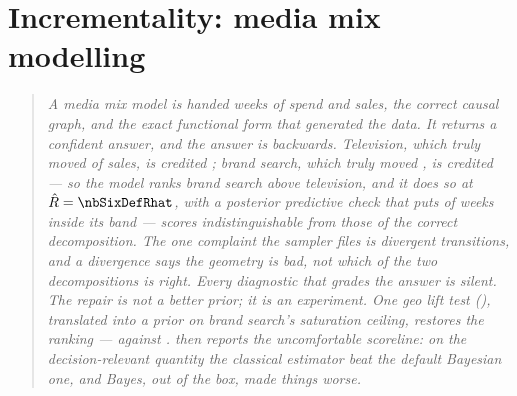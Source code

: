 %
\chapter{Incrementality: media mix modelling}
\label{ch:mmm}

\begin{quote}\small
\emph{A media mix model is handed \nbSixNWeeks{} weeks of spend and sales, the correct causal
graph, and the exact functional form that generated the data. It returns a confident answer, and
the answer is backwards. Television, which truly moved \eur{\nbSixTrueTv} of sales, is credited
\eur{\nbSixDefTv}; brand search, which truly moved \eur{\nbSixTrueBs}, is credited
\eur{\nbSixDefBs} --- so the model ranks brand search \emph{above} television, and it does so at
$\hat R = \nbSixDefRhat$, with a posterior predictive check that puts \pc{\nbSixPpcCovDef} of weeks
inside its  band --- scores indistinguishable from those of the \emph{correct}
decomposition. The one complaint the sampler files is \nbSixDefDiv{} divergent transitions, and a
divergence says the geometry is bad, not which of the two decompositions is right. Every diagnostic
that grades the \emph{answer} is silent. The repair is not a better prior; it is an experiment. One geo lift test (), translated
into a prior on brand search's saturation ceiling, restores the ranking ---
\eur{\nbSixCalTv} against \eur{\nbSixCalBs}.  then reports the
uncomfortable scoreline: on the decision-relevant quantity the \emph{classical} estimator beat the
default Bayesian one, and Bayes, out of the box, made things worse.}
\end{quote}

